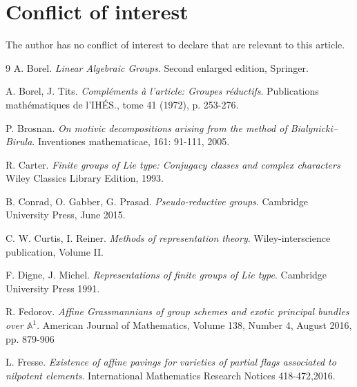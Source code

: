 \documentclass{amsart}
\theoremstyle{plain}
\theoremstyle{definition}
\theoremstyle{remark}
\begin{document}
\section{Conflict of interest} The author has no conflict of interest to declare that are relevant to this article.
\begin{thebibliography}{9}
A. Borel.
\textit{Linear Algebraic Groups}.
Second enlarged edition, Springer.

A. Borel, J. Tits.
\textit{Compléments à l’article: Groupes réductifs}.
Publications mathématiques de l’IHÉS., tome 41 (1972), p. 253-276.

P. Brosnan. 
\textit{On motivic decompositions arising from the method of Bialynicki--Birula}. 
Inventiones mathematicae, 161: 91-111, 2005.

R. Carter.
\textit{Finite groups of
Lie type: Conjugacy classes and complex characters}
Wiley Classics Library Edition, 1993.

B. Conrad, O. Gabber, G. Prasad. 
\textit{Pseudo-reductive groups}.
Cambridge University Press, June 2015.

C. W. Curtis, I. Reiner.
\textit{Methods of representation theory}.
Wiley-interscience publication, Volume II.

F. Digne, J. Michel. 
\textit{Representations of finite groups of Lie type}. 
Cambridge University Press 1991.

R. Fedorov.
\textit{Affine Grassmannians of group schemes and exotic principal bundles over $\mathbb{A}^1$}.
American Journal of Mathematics,
Volume 138, Number 4, August 2016,
pp. 879-906

L. Fresse. 
\textit{Existence of affine pavings for varieties of partial flags associated to nilpotent elements}.
International Mathematics Research Notices 418-472,2016.


\end{thebibliography}
\end{document}
